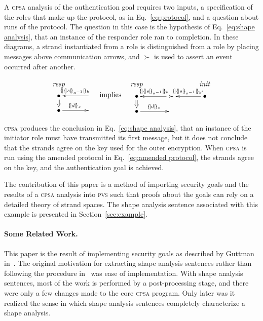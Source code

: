 \documentclass[titlepage,12pt]{article}
\newcommand{\cpsa}{\textsc{cpsa}}
\newcommand{\pvs}{\textsc{pvs}}
\newcommand{\fn}[1]{\ensuremath{\operatorname{\mathit{#1}}}}
\newcommand{\enc}[2]{\ensuremath{\{\!|#1|\!\}_{#2}}}
\newcommand{\invk}[1]{{#1}^{-1}}
\newcommand{\init}{\fn{init}}
\newcommand{\resp}{\fn{resp}}
\begin{document}
A {\cpsa} analysis of the authentication goal requires two inputs, a
specification of the roles that make up the protocol, as in
Eq.~\ref{eq:protocol}, and a question about runs of the protocol.  The
question in this case is the hypothesis of Eq.~\ref{eq:shape
  analysis}, that an instance of the responder role ran to completion.
In these diagrams, a strand instantiated from a role is distinguished
from a role by placing messages above communication arrows, and
$\succ$ is used to assert an event occurred after another.

\begin{equation}\label{eq:shape analysis}
\begin{array}{rcl}
\xymatrix@R=1em@C=3em{\raisebox{-0.5ex}[0ex][0ex]{\strut\resp}\\
\bullet\ar@{=>}[d]&\ar[l]_{\enc{\enc{s}{\invk{a}}}{b}}\\
\bullet\ar[r]^{\enc{d}{s}}&}&
\raisebox{-4.0ex}{implies}&
\xymatrix@R=1em@C=3em{\raisebox{-0.5ex}[0ex][0ex]{\strut\resp}&&
\raisebox{-0.5ex}[0ex][0ex]{\strut\init}\\
\bullet\ar@{=>}[d]&\succ\ar[l]_{\enc{\enc{s}{\invk{a}}}{b}}&\bullet
\ar[l]_{\enc{\enc{s}{\invk{a}}}{b'}}\\
\bullet\ar[r]^{\enc{d}{s}}&}
\end{array}
\end{equation}

{\cpsa} produces the conclusion in Eq.~\ref{eq:shape analysis}, that
an instance of the initiator role must have transmitted its first
message, but it does not conclude that the strands agree on the key
used for the outer encryption.  When {\cpsa} is run using the amended
protocol in Eq.~\ref{eq:amended protocol}, the strands agree on the
key, and the authentication goal is achieved.

The contribution of this paper is a method of importing security goals
and the results of a {\cpsa} analysis into {\pvs} such that proofs
about the goals can rely on a detailed theory of strand spaces.  The
shape analysis sentence associated with this example is presented in
Section~\ref{sec:example}.

\paragraph{Some Related Work.}

This paper is the result of implementing security goals as described
by Guttman in~\cite{Guttman09}.  The original motivation for extracting
shape analysis sentences rather than following the procedure
in~\cite{Guttman09} was ease of implementation.  With shape analysis
sentences, most of the work is performed by a post-processing stage,
and there were only a few changes made to the core {\cpsa} program.
Only later was it realized the sense in which shape analysis sentences
completely characterize a shape analysis.
\end{document}
